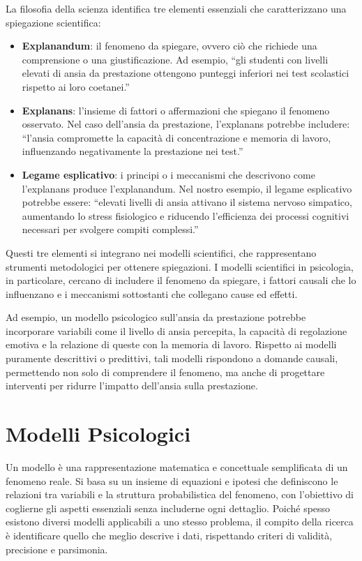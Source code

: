 \documentclass[
  letterpaper,
]{krantz}
\providecommand{\tightlist}{%
  \setlength{\itemsep}{0pt}\setlength{\parskip}{0pt}}\usepackage{longtable,booktabs,array}
\begin{document}
La filosofia della scienza identifica tre elementi essenziali che
caratterizzano una spiegazione scientifica:

\begin{itemize}
\tightlist
\item
  \textbf{Explanandum}: il fenomeno da spiegare, ovvero ciò che richiede
  una comprensione o una giustificazione. Ad esempio, ``gli studenti con
  livelli elevati di ansia da prestazione ottengono punteggi inferiori
  nei test scolastici rispetto ai loro coetanei.''
\item
  \textbf{Explanans}: l'insieme di fattori o affermazioni che spiegano
  il fenomeno osservato. Nel caso dell'ansia da prestazione, l'explanans
  potrebbe includere: ``l'ansia compromette la capacità di
  concentrazione e memoria di lavoro, influenzando negativamente la
  prestazione nei test.''
\item
  \textbf{Legame esplicativo}: i principi o i meccanismi che descrivono
  come l'explanans produce l'explanandum. Nel nostro esempio, il legame
  esplicativo potrebbe essere: ``elevati livelli di ansia attivano il
  sistema nervoso simpatico, aumentando lo stress fisiologico e
  riducendo l'efficienza dei processi cognitivi necessari per svolgere
  compiti complessi.''
\end{itemize}

Questi tre elementi si integrano nei modelli scientifici, che
rappresentano strumenti metodologici per ottenere spiegazioni. I modelli
scientifici in psicologia, in particolare, cercano di includere il
fenomeno da spiegare, i fattori causali che lo influenzano e i
meccanismi sottostanti che collegano cause ed effetti.

Ad esempio, un modello psicologico sull'ansia da prestazione potrebbe
incorporare variabili come il livello di ansia percepita, la capacità di
regolazione emotiva e la relazione di queste con la memoria di lavoro.
Rispetto ai modelli puramente descrittivi o predittivi, tali modelli
rispondono a domande causali, permettendo non solo di comprendere il
fenomeno, ma anche di progettare interventi per ridurre l'impatto
dell'ansia sulla prestazione.

\section{Modelli Psicologici}\label{modelli-psicologici}

Un modello è una rappresentazione matematica e concettuale semplificata
di un fenomeno reale. Si basa su un insieme di equazioni e ipotesi che
definiscono le relazioni tra variabili e la struttura probabilistica del
fenomeno, con l'obiettivo di coglierne gli aspetti essenziali senza
includerne ogni dettaglio. Poiché spesso esistono diversi modelli
applicabili a uno stesso problema, il compito della ricerca è
identificare quello che meglio descrive i dati, rispettando criteri di
validità, precisione e parsimonia.
\end{document}
